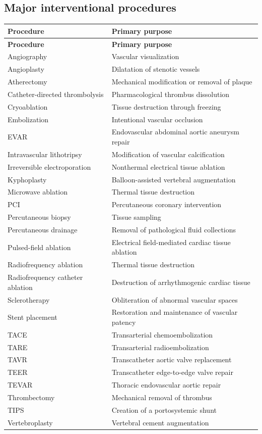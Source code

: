 \subsection{Major interventional procedures}
\begin{longtable}{@{}p{}p{}@{}}
\toprule
\textbf{Procedure} & \textbf{Primary purpose} \\
\midrule
\endfirsthead
\toprule
\textbf{Procedure} & \textbf{Primary purpose} \\
\midrule
\endhead
Angiography & Vascular visualization \\
Angioplasty & Dilatation of stenotic vessels \\
Atherectomy & Mechanical modification or removal of plaque \\
Catheter-directed thrombolysis & Pharmacological thrombus dissolution \\
Cryoablation & Tissue destruction through freezing \\
Embolization & Intentional vascular occlusion \\
EVAR & Endovascular abdominal aortic aneurysm repair \\
Intravascular lithotripsy & Modification of vascular calcification \\
Irreversible electroporation & Nonthermal electrical tissue ablation \\
Kyphoplasty & Balloon-assisted vertebral augmentation \\
Microwave ablation & Thermal tissue destruction \\
PCI & Percutaneous coronary intervention \\
Percutaneous biopsy & Tissue sampling \\
Percutaneous drainage & Removal of pathological fluid collections \\
Pulsed-field ablation & Electrical field-mediated cardiac tissue ablation \\
Radiofrequency ablation & Thermal tissue destruction \\
Radiofrequency catheter ablation & Destruction of arrhythmogenic cardiac tissue \\
Sclerotherapy & Obliteration of abnormal vascular spaces \\
Stent placement & Restoration and maintenance of vascular patency \\
TACE & Transarterial chemoembolization \\
TARE & Transarterial radioembolization \\
TAVR & Transcatheter aortic valve replacement \\
TEER & Transcatheter edge-to-edge valve repair \\
TEVAR & Thoracic endovascular aortic repair \\
Thrombectomy & Mechanical removal of thrombus \\
TIPS & Creation of a portosystemic shunt \\
Vertebroplasty & Vertebral cement augmentation \\
\bottomrule
\end{longtable}

